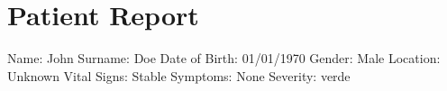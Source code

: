 \documentclass{article}%
\begin{document}
%
\normalsize%
\section{Patient Report}%
\label{sec:PatientReport}%
Name: John\newline%
%
Surname: Doe\newline%
%
Date of Birth: 01/01/1970\newline%
%
Gender: Male\newline%
%
Location: Unknown\newline%
%
Vital Signs: Stable\newline%
%
Symptoms: None\newline%
%
Severity: verde\newline%

%
\end{document}
